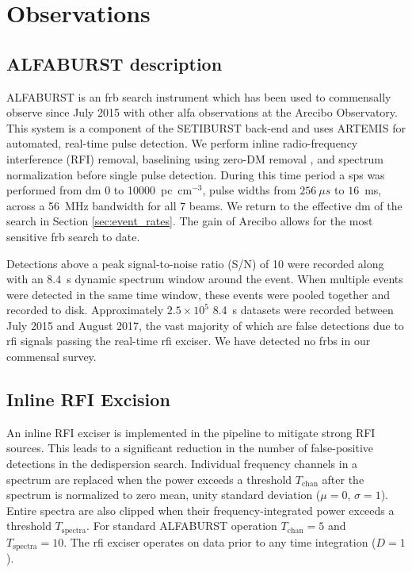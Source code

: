\documentclass[a4paper,fleqn,usenatbib]{mnras}
\begin{document}
\section{Observations}
\label{sec:overview}

\subsection{ALFABURST description}

ALFABURST is an \gls{frb} search instrument which has been used to commensally
observe since July 2015 with other \gls{alfa} observations at the Arecibo
Observatory. This system is a component of the SETIBURST back-end
\citep{2017ApJS..228...21C} and uses ARTEMIS \citep{2015MNRAS.452.1254K} for
automated, real-time pulse detection. We perform inline radio-frequency
interference (RFI) removal, baselining using zero-DM removal
\citep{2009MNRAS.395..410E}, and spectrum normalization before single pulse
detection. During this time period a \gls{sps} was performed from \gls{dm} 0 to
10000~pc~cm$^{-3}$, pulse widths from $256~\mu s$ to $16$~ms, across a 56~MHz bandwidth for
all 7 beams. We return to the effective \gls{dm} of the search in Section
\ref{sec:event_rates}. The gain of Arecibo allows for the most sensitive
\gls{frb} search to date.

Detections above a peak signal-to-noise ratio (S/N) of 10 were recorded along
with an $8.4$~s dynamic spectrum window around the event. When multiple events
were detected in the same time window, these events were pooled together and
recorded to disk.  Approximately $2.5 \times 10^5$ 8.4~s datasets were recorded
between July 2015 and August 2017, the vast majority of which are false
detections due to \gls{rfi} signals passing the real-time \gls{rfi} exciser. We
have detected no \glspl{frb} in our commensal survey.


\subsection{Inline RFI Excision}
\label{sec:rfi_excise}

An inline RFI exciser is implemented in the pipeline to mitigate strong RFI
sources. This leads to a significant reduction in the number of false-positive
detections in the dedispersion search.  Individual frequency channels in a
spectrum are replaced when the power exceeds a threshold $T_{\textrm{chan}}$
after the spectrum is normalized to zero mean, unity standard deviation
($\mu=0$, $\sigma=1$). Entire spectra are also clipped when their
frequency-integrated power exceeds a threshold $T_{\textrm{spectra}}$. For
standard ALFABURST operation $T_{\textrm{chan}} = 5$ and $T_{\textrm{spectra}} =
10$.  The \gls{rfi} exciser operates on data prior to any time integration
($D=1$).
\end{document}
